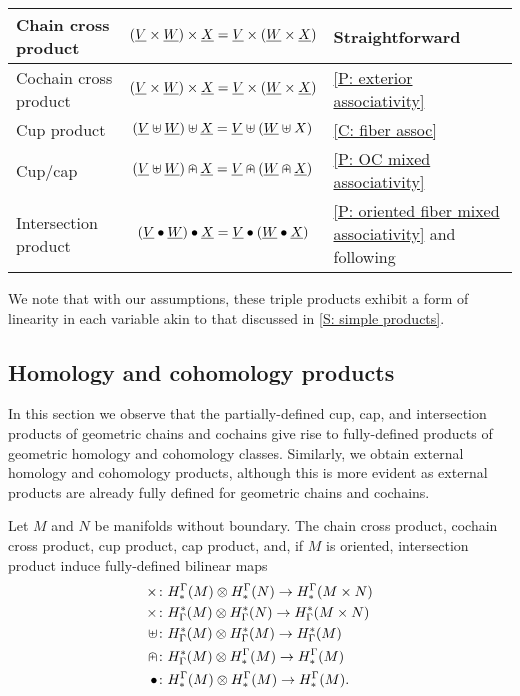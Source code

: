 \begin{center}
	\begin{tabular}{|l|c|l|}
		\hline
		Chain cross product& $(\underline{V} \times \underline{W}) \times \underline{X} = \underline{V} \times (\underline{W} \times \underline{X})$&Straightforward\\
		\hline
		Cochain cross product& $(\underline{V} \times \underline{W}) \times \underline{X} = \underline{V} \times (\underline{W} \times \underline{X})$&\cref{P: exterior associativity}\\
		\hline
		Cup product &$(\underline{V}\uplus \underline{W})\uplus\underline{X} = \underline{V}\uplus(\underline{W}\uplus X)$&\cref{C: fiber assoc} \\
		\hline
		Cup/cap & $(\underline{V} \uplus \underline{W})\nplus \underline{X} = \underline{V}\nplus(\underline{W}\nplus\underline{X})$& \cref{P: OC mixed associativity}\\
		\hline
		Intersection product &
		$(\underline{V}\bullet\underline{W})\bullet\underline{X} = \underline{V}\bullet(\underline{W}\bullet \underline{X})$&\cref{P: oriented fiber mixed associativity} and following\\
		\hline
	\end{tabular}
\end{center}

We note that with our assumptions, these triple products exhibit a form of linearity in each variable akin to that discussed in \cref{S: simple products}.

\subsection{Homology and cohomology products}\label{S: homology products}

In this section we observe that the partially-defined cup, cap, and intersection products of geometric chains and cochains give rise to fully-defined products of geometric homology and cohomology classes.
Similarly, we obtain external homology and cohomology products, although this is more evident as external products are already fully defined for geometric chains and cochains.

\begin{theorem}\label{T: (co)homology products}
	Let $M$ and $N$ be manifolds without boundary.
	The chain cross product, cochain cross product, cup product, cap product, and, if $M$ is oriented, intersection product induce fully-defined bilinear maps
	\begin{align*}
		\times \colon & H^\Gamma_*(M) \otimes H^\Gamma_*(N) \to H^\Gamma_*(M \times N)\\
		\times \colon & H_\Gamma^*(M) \otimes H_\Gamma^*(N) \to H_\Gamma^*(M \times N)\\
		\uplus \colon & H_\Gamma^*(M) \otimes H_\Gamma^*(M) \to H_\Gamma^*(M)\\
		\nplus \colon & H_\Gamma^*(M) \otimes H^\Gamma_*(M) \to H^\Gamma_*(M)\\
		\bullet \colon & H^\Gamma_*(M) \otimes H^\Gamma_*(M) \to H^\Gamma_*(M).\\
	\end{align*}
\end{theorem}

